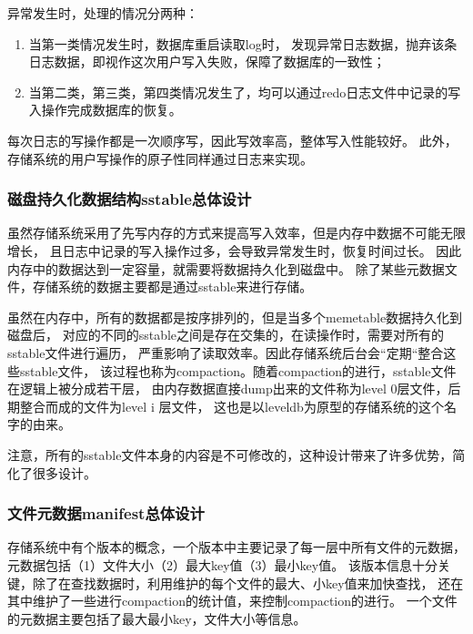 	异常发生时，处理的情况分两种：
		\begin{enumerate}
			\item 当第一类情况发生时，数据库重启读取log时，
			发现异常日志数据，抛弃该条日志数据，即视作这次用户写入失败，保障了数据库的一致性；
			\item 当第二类，第三类，第四类情况发生了，均可以通过redo日志文件中记录的写入操作完成数据库的恢复。
		\end{enumerate}
		每次日志的写操作都是一次顺序写，因此写效率高，整体写入性能较好。
		此外，存储系统的用户写操作的原子性同样通过日志来实现。

		\subsubsection{磁盘持久化数据结构sstable总体设计}

		虽然存储系统采用了先写内存的方式来提高写入效率，但是内存中数据不可能无限增长，
		且日志中记录的写入操作过多，会导致异常发生时，恢复时间过长。
		因此内存中的数据达到一定容量，就需要将数据持久化到磁盘中。
		除了某些元数据文件，存储系统的数据主要都是通过sstable来进行存储。

		虽然在内存中，所有的数据都是按序排列的，但是当多个memetable数据持久化到磁盘后，
		对应的不同的sstable之间是存在交集的，在读操作时，需要对所有的sstable文件进行遍历，
		严重影响了读取效率。因此存储系统后台会“定期“整合这些sstable文件，
		该过程也称为compaction。随着compaction的进行，sstable文件在逻辑上被分成若干层，
		由内存数据直接dump出来的文件称为level 0层文件，后期整合而成的文件为level i 层文件，
		这也是以leveldb为原型的存储系统的这个名字的由来。

		注意，所有的sstable文件本身的内容是不可修改的，这种设计带来了许多优势，简化了很多设计。

		\subsubsection{文件元数据manifest总体设计}

		存储系统中有个版本的概念，一个版本中主要记录了每一层中所有文件的元数据，
		元数据包括（1）文件大小（2）最大key值（3）最小key值。
		该版本信息十分关键，除了在查找数据时，利用维护的每个文件的最大、小key值来加快查找，
		还在其中维护了一些进行compaction的统计值，来控制compaction的进行。
		一个文件的元数据主要包括了最大最小key，文件大小等信息。
		

